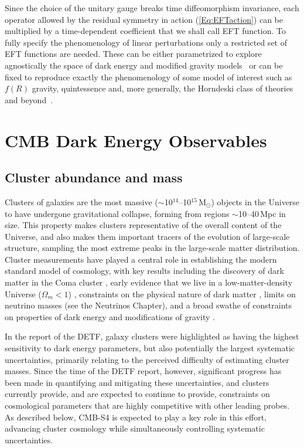Since the choice of the unitary gauge breaks time diffeomorphism invariance, each operator allowed by the residual symmetry in action (\ref{Eq:EFTaction}) can be multiplied by a time-dependent coefficient that we shall call EFT function. To fully specify the phenomenology of linear perturbations only a restricted set of EFT functions are needed. These can be either parametrized to explore agnostically the space of dark energy and modified gravity models~\cite{Gleyzes:2013ooa,Bloomfield:2013efa,Piazza:2013coa,Gleyzes:2014rba} or can be fixed to reproduce exactly the phenomenology of some model of interest such as $f(R)$ gravity, quintessence and, more generally, the Horndeski class of theories and beyond~\cite{Gleyzes:2014dya,Frusciante:2015maa,Frusciante:2016xoj}.
%


\section{CMB  Dark Energy Observables}
\label{sec:deobs}

\subsection{Cluster abundance and mass}

Clusters of galaxies are the most massive ($\sim$10$^{14}$--10$^{15}$\,M$_{\odot}$) objects in the Universe to have undergone gravitational collapse, forming from regions $\sim$10--40\,Mpc in size.  This property makes clusters representative of the overall content of the Universe, and also makes them important tracers of the evolution of large-scale structure, sampling the most extreme peaks in the large-scale matter distribution. Cluster measurements have played a central role in establishing the modern standard model of cosmology, with key results including the discovery of dark matter in the Coma cluster \cite{Zwicky:1933gu}, early evidence that we live in a low-matter-density Universe ($\Omega_m < 1$) \cite{White:1993wm, Donahue:1997sp, Bahcall:1998ur}, constraints on the physical nature of dark matter \cite{Clowe:2006eq}, limits on neutrino masses (see the Neutrinos Chapter), and a broad swathe of constraints on properties of dark energy and modifications of gravity \cite{Vikhlinin:2008ym, Mantz:2009fw, Rapetti:2012bu, Benson:2011uta, Mantz:2014xba, Mantz:2014paa}.

In the report of the DETF, galaxy clusters were highlighted as having the highest sensitivity to dark energy parameters, but also potentially the largest systematic uncertainties, primarily relating to the perceived difficulty of estimating cluster masses. Since the time of the DETF report, however, significant progress has been made in quantifying and mitigating these uncertainties, and clusters currently provide, and are expected to continue to provide, constraints on cosmological parameters that are highly competitive with other leading probes. As described below, CMB-S4 is expected to play a key role in this effort, advancing cluster cosmology while simultaneously controlling systematic uncertainties.

